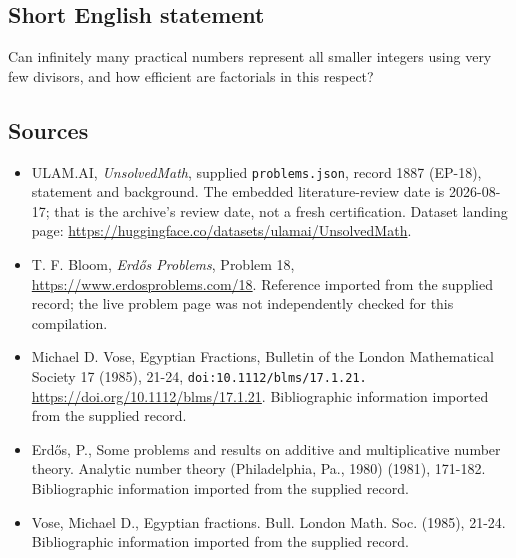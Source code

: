 \documentclass[11pt,a4paper]{article}
\begin{document}
\subsection{Short English statement}

Can infinitely many practical numbers represent all smaller integers using very few divisors, and how efficient are factorials in this respect?

\subsection{Sources}

{\small

\begin{itemize}

\item[\hypertarget{source:1887:1}{S1}] ULAM.AI, \emph{UnsolvedMath}, supplied \texttt{problems.json}, record 1887 (EP-18), statement and background. The embedded literature-review date is 2026-08-17; that is the archive’s review date, not a fresh certification. Dataset landing page: \url{https://huggingface.co/datasets/ulamai/UnsolvedMath}.

\item[\hypertarget{source:1887:2}{S2}] T. F. Bloom, \emph{Erdős Problems}, Problem 18, \url{https://www.erdosproblems.com/18}. Reference imported from the supplied record; the live problem page was not independently checked for this compilation.

\item[\hypertarget{source:1887:3}{S3}] Michael D. Vose, Egyptian Fractions, Bulletin of the London Mathematical Society 17 (1985), 21-24, \nolinkurl{doi:10.1112/blms/17.1.21.} \url{https://doi.org/10.1112/blms/17.1.21}. Bibliographic information imported from the supplied record.

\item[\hypertarget{source:1887:4}{S4}] Erd\H{o}s, P., Some problems and results on additive and multiplicative number theory. Analytic number theory (Philadelphia, Pa., 1980) (1981), 171-182. Bibliographic information imported from the supplied record.

\item[\hypertarget{source:1887:5}{S5}] Vose, Michael D., Egyptian fractions. Bull. London Math. Soc. (1985), 21-24. Bibliographic information imported from the supplied record.

\end{itemize}

}

\label{end:1887}
\end{document}
